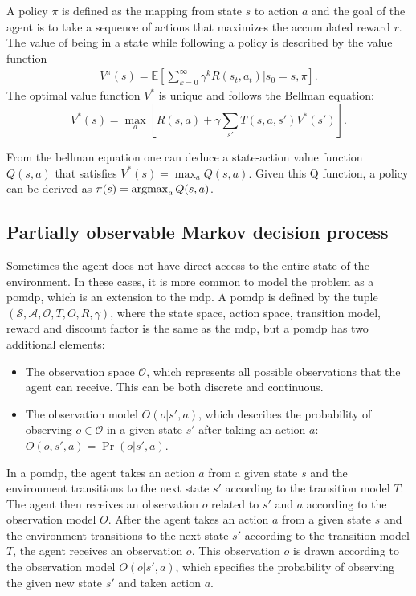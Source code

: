 A policy $\pi$ is defined as the mapping from state $s$ to action $a$ and the goal of the agent is to take a sequence of actions that maximizes the accumulated reward $r$. The value of being in a state while following a policy is described by the value function
\begin{align}
    V^\pi(s) = \mathbb{E} \left[ \sum_{k=0}^\infty \gamma^k R(s_t, a_t) | s_0 = s, \pi \right].
\end{align}
The optimal value function $V^*$ is unique and follows the Bellman equation: 
\begin{equation}
    V^*(s)= \max_{a} \left[ R(s, a) + \gamma \sum_{s'} T(s,a,s') V^*(s') \right].
    \label{eq:bellman}
\end{equation}

From the bellman equation one can deduce a state-action value function $Q(s,a)$ that satisfies $V^*(s)=\max_a Q(s,a)$. Given this Q function, a policy can be derived as $\pi(s) = \operatorname*{argmax}_a Q(s,a)$. 

\subsection{Partially observable Markov decision process}\label{sec:background_pomdp}
Sometimes the agent does not have direct access to the entire state of the environment. In these cases, it is more common to model the problem as a \gls{pomdp}, which is an extension to the \gls{mdp}. A \gls{pomdp} is defined by the tuple $(\mathcal{S},\mathcal{A},\mathcal{O},T,O,R,\gamma)$, where the state space, action space, transition model, reward and discount factor is the same as the \gls{mdp}, but a \gls{pomdp} has two additional elements: 
\begin{itemize}
    \item The observation space $\mathcal{O}$, which represents all possible observations that the agent can receive. This can be both discrete and continuous.
    \item The observation model $O(o|s',a)$, which describes the probability of observing $o \in \mathcal{O}$ in a given state $s'$ after taking an action $a$: $O(o,s',a)=\Pr(o|s',a)$.
\end{itemize}

In a \gls{pomdp}, the agent takes an action $a$ from a given state $s$ and the environment transitions to the next state $s'$ according to the transition model $T$. The agent then receives an observation $o$ related to $s'$ and $a$ according to the observation model $O$. After the agent takes an action $a$ from a given state $s$ and the environment transitions to the next state $s'$ according to the transition model $T$, the agent receives an observation $o$. This observation $o$ is drawn according to the observation model $O(o|s',a)$, which specifies the probability of observing the given new state $s'$ and taken action $a$.

